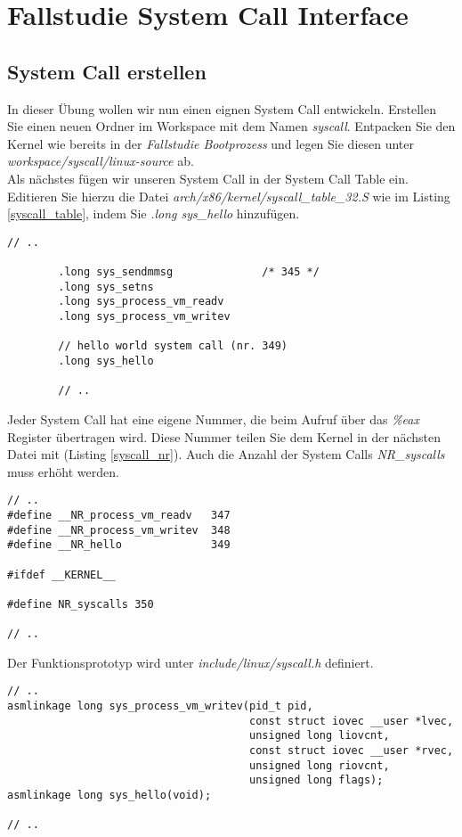 \section{Fallstudie System Call Interface}

\subsection{System Call erstellen}

In dieser Übung wollen wir nun einen eignen System Call entwickeln. Erstellen Sie einen neuen Ordner im 
Workspace mit dem Namen \emph{syscall}. Entpacken Sie den Kernel wie bereits in der \emph{Fallstudie Bootprozess}
und legen Sie diesen unter \emph{workspace/syscall/linux-source} ab. \\

Als nächstes fügen wir unseren System Call in der System Call Table ein. Editieren Sie hierzu die Datei
\emph{arch/x86/kernel/syscall\_table\_32.S} wie im Listing \ref{syscall_table}, indem Sie \emph{.long sys\_hello}
hinzufügen. 

\begin{lstlisting}[label=syscall_table,caption=arch/x86/kernel/syscall\_table\_32.S]
        // ..

        .long sys_sendmmsg              /* 345 */
        .long sys_setns
        .long sys_process_vm_readv
        .long sys_process_vm_writev

        // hello world system call (nr. 349)
        .long sys_hello

        // ..
\end{lstlisting} \hfill

Jeder System Call hat eine eigene Nummer, die beim Aufruf über das \emph{\%eax} Register übertragen wird. Diese Nummer
teilen Sie dem Kernel in der nächsten Datei mit (Listing \ref{syscall_nr}). Auch die Anzahl der System Calls \emph{NR\_syscalls}
muss erhöht werden.

\begin{lstlisting}[label=syscall_nr,caption=arch/x86/include/asm/unistd\_32.S]
// ..
#define __NR_process_vm_readv   347
#define __NR_process_vm_writev  348
#define __NR_hello              349

#ifdef __KERNEL__

#define NR_syscalls 350

// ..
\end{lstlisting} \hfill


Der Funktionsprototyp wird unter \emph{include/linux/syscall.h} definiert.
\begin{lstlisting}[caption=include/linux/syscall.h]
// ..
asmlinkage long sys_process_vm_writev(pid_t pid,
                                      const struct iovec __user *lvec,
                                      unsigned long liovcnt,
                                      const struct iovec __user *rvec,
                                      unsigned long riovcnt,
                                      unsigned long flags);
asmlinkage long sys_hello(void);

// ..
\end{lstlisting} \hfill

